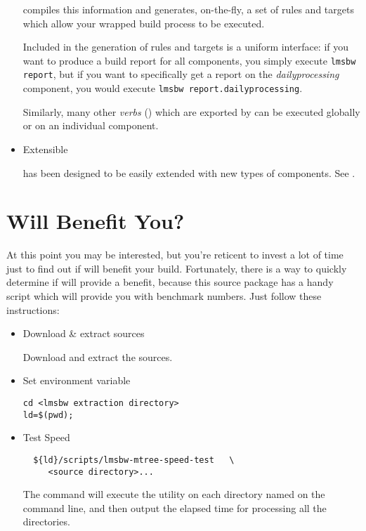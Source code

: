 \begin{itemize}
  \lmsbw compiles this information and generates, on-the-fly, a set of
  \make rules and targets which allow your wrapped build process to be
  executed.

  Included in the generation of rules and targets is a uniform
  interface: if you want to produce a build report for all components,
  you simply execute \texttt{lmsbw report}, but if you want to
  specifically get a report on the \emph{dailyprocessing} component,
  you would execute \texttt{lmsbw report.dailyprocessing}.

  Similarly, many other \emph{verbs} () which
  are exported by \lmsbw can be executed globally or on an individual
  component.

\item Extensible

  \lmsbw has been designed to be easily extended with new types of
  components.  See .
\end{itemize}

\section{Will \lmsbw Benefit You?}

At this point you may be interested, but you're reticent to invest a
lot of time just to find out if \lmsbw will benefit your build.
Fortunately, there is a way to quickly determine if \lmsbw will
provide a benefit, because this source package has a handy script
which will provide you with benchmark numbers.  Just follow these
instructions:

\begin{itemize}
\item Download \& extract \lmsbw sources

  Download and extract the sources.

\item Set environment variable

\begin{verbatim}
cd <lmsbw extraction directory>
ld=$(pwd);
\end{verbatim}

\item Test Speed

\begin{verbatim}
  ${ld}/scripts/lmsbw-mtree-speed-test   \
     <source directory>...
\end{verbatim}

  The command will execute the \mtree utility on each directory named
  on the command line, and then output the elapsed time for processing
  all the directories.

\end{itemize}

